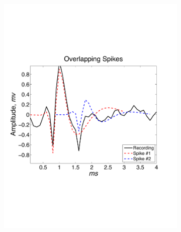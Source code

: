 

\begin{center}
\begin{figure}
\begin{subfigure}[b]{.3\textwidth}
\includegraphics[width=\textwidth]{../figs/alloverlappingspikes/olspike3}
\caption{}
\label{fig:overlapping}
\end{subfigure}
\begin{subfigure}[b]{.3\textwidth}

\end{subfigure}
\end{figure}
\end{center}
